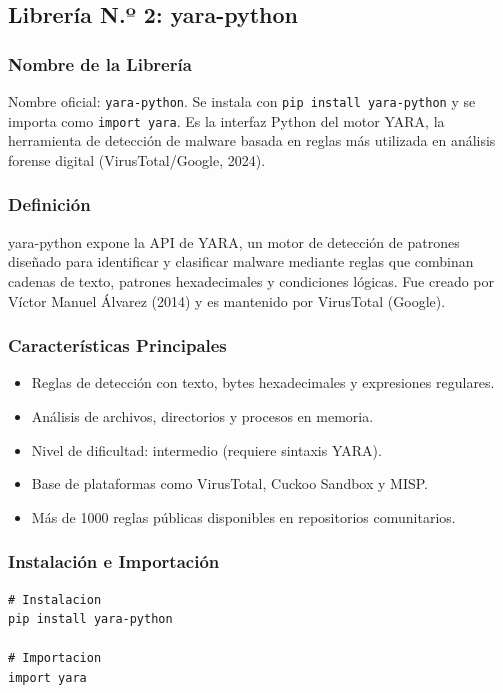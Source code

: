 \documentclass[12pt,a4paper]{article}
\begin{document}
\subsection{Librería N.º 2: yara-python}

\subsubsection{Nombre de la Librería}

Nombre oficial: \texttt{yara-python}. Se instala con
\texttt{pip install yara-python} y se importa como \texttt{import yara}.
Es la interfaz Python del motor YARA, la herramienta de detección de
malware basada en reglas más utilizada en análisis forense digital
(VirusTotal/Google, 2024).

\subsubsection{Definición}

yara-python expone la API de YARA, un motor de detección de patrones
diseñado para identificar y clasificar malware mediante reglas que
combinan cadenas de texto, patrones hexadecimales y condiciones lógicas.
Fue creado por Víctor Manuel Álvarez (2014) y es mantenido por
VirusTotal (Google).

\subsubsection{Características Principales}

\begin{itemize}
\item Reglas de detección con texto, bytes hexadecimales y expresiones regulares.
\item Análisis de archivos, directorios y procesos en memoria.
\item Nivel de dificultad: intermedio (requiere sintaxis YARA).
\item Base de plataformas como VirusTotal, Cuckoo Sandbox y MISP.
\item Más de 1000 reglas públicas disponibles en repositorios comunitarios.
\end{itemize}

\subsubsection{Instalación e Importación}

\begin{lstlisting}[caption={Instalación e importación de yara-python},
                   label=lst:yara_install]
# Instalacion
pip install yara-python

# Importacion
import yara
\end{lstlisting}
\end{document}
